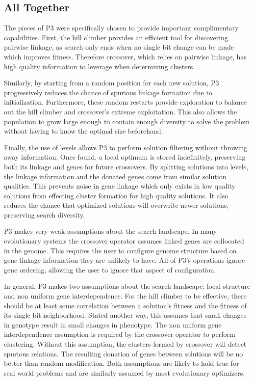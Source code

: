 \documentclass{sig-alternate}
\begin{document}
\subsection{All Together}
\label{sec-alltogether}
The pieces of P3 were specifically chosen to provide important complimentary capabilities.  First,
the hill climber provides an efficient tool for discovering pairwise linkage, as
search only ends when no single bit change can be made which improves fitness.
Therefore crossover, which relies on pairwise linkage, has high quality information
to leverage when determining clusters.

Similarly, by starting from a random position for each new solution, P3 progressively reduces
the chance of spurious linkage formation due to initialization.  Furthermore, these random
restarts provide exploration to balance out the hill climber and crossover's extreme
exploitation.  This also allows the population to grow large enough to contain enough
diversity to solve the problem without having to know the optimal size beforehand.

Finally, the use of levels allows P3 to perform solution filtering
without throwing away information.  Once found, a local optimum is
stored indefinitely, preserving both its linkage and genes for future
crossovers.  By splitting solutions into levels, the linkage
information and the donated genes come from similar solution
qualities.  This prevents noise in gene linkage which only exists in
low quality solutions from effecting cluster formation for high
quality solutions.  It also reduces the chance that optimized
solutions will overwrite newer solutions, preserving
search diversity.

P3 makes very weak
assumptions about the search landscape.  In many evolutionary
systems the crossover operator assumes linked genes
are collocated in the genome.  This requires the user
to configure genome structure based on gene linkage information they
are unlikely to have. All of
P3's operations ignore gene ordering, allowing the user to ignore
that aspect of configuration.

In general, P3 makes two assumptions about the search landscape:
local structure and non uniform gene interdependence.
For the hill climber to be effective, there should be at least some
correlation between a solution's fitness and the fitness of its single
bit neighborhood. Stated another way, this assumes that small changes
in genotype result in small changes in phenotype. The non uniform gene
interdependence assumption is required by the crossover operator to
perform clustering.  Without this assumption, the clusters formed by
crossover will detect spurious relations. The resulting donation of genes
between solutions will be no better than random modification.  Both
assumptions are likely to hold true for real world problems and are similarly
assumed by most evolutionary optimizers.
\end{document}
